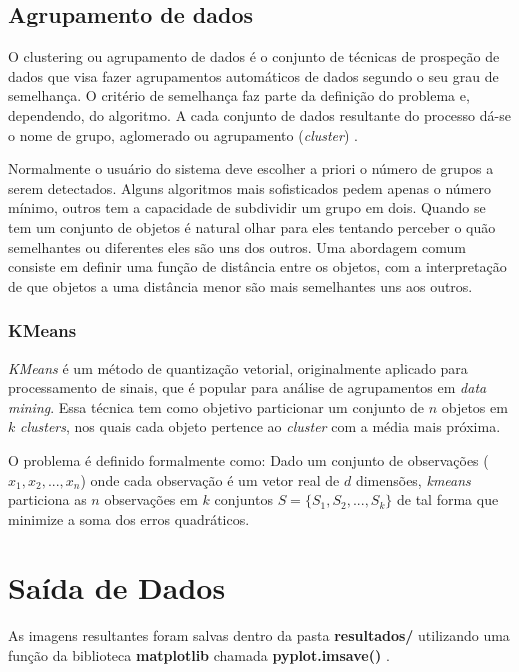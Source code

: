 \documentclass[twoside,twocolumn]{article}
\begin{document}
\subsection{Agrupamento de dados}

O clustering ou agrupamento de dados é o conjunto de técnicas de prospeção de dados que visa fazer agrupamentos automáticos de dados segundo o seu grau de semelhança. O critério de semelhança faz parte da definição do problema e, dependendo, do algoritmo. A cada conjunto de dados resultante do processo dá-se o nome de grupo, aglomerado ou agrupamento (\textit{cluster}) \cite{b4}.

Normalmente o usuário do sistema deve escolher a priori o número de grupos a serem detectados. Alguns algoritmos mais sofisticados pedem apenas o número mínimo, outros tem a capacidade de subdividir um grupo em dois. Quando se tem um conjunto de objetos é natural olhar para eles tentando perceber o quão semelhantes ou diferentes eles são uns dos outros. Uma abordagem comum consiste em definir uma função de distância entre os objetos, com a interpretação de que objetos a uma distância menor são mais semelhantes uns aos outros.

\subsubsection{KMeans}

\textit{KMeans} é um método de quantização vetorial, originalmente aplicado para processamento de sinais, que é popular para análise de agrupamentos em \textit{data mining}. Essa técnica tem como objetivo particionar um conjunto de $n$ objetos em $k$ \textit{clusters}, nos quais cada objeto pertence ao \textit{cluster} com a média mais próxima.

O problema é definido formalmente como: Dado um conjunto de observações ($x_{1}, x_{2}, ..., x_{n}$) onde cada observação é um vetor real de $d$ dimensões, \textit{kmeans} particiona as $n$ observações em $k$ conjuntos $S = \{S_{1}, S_{2}, ..., S_{k}\}$ de tal forma que minimize a soma dos erros quadráticos.
 

\section{Saída de Dados}

As imagens resultantes foram salvas dentro da pasta \textbf{resultados/} utilizando uma função da biblioteca \textbf{matplotlib} chamada \textbf{pyplot.imsave()} \cite{b3}.
\end{document}
